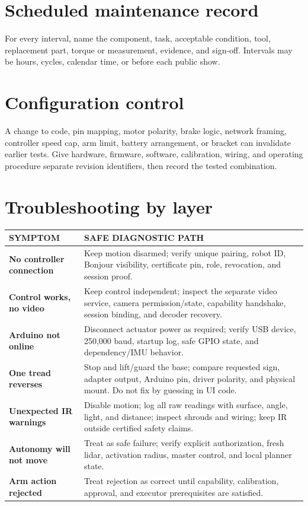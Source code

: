 \documentclass[10pt,openany]{book}
\begin{document}
\section{Scheduled maintenance record}

For every interval, name the component, task, acceptable condition, tool, replacement part, torque or measurement, evidence, and sign-off. Intervals may be hours, cycles, calendar time, or before each public show.

\section{Configuration control}

A change to code, pin mapping, motor polarity, brake logic, network framing, controller speed cap, arm limit, battery arrangement, or bracket can invalidate earlier tests. Give hardware, firmware, software, calibration, wiring, and operating procedure separate revision identifiers, then record the tested combination.

\section{Troubleshooting by layer}

\begin{tabularx}{\textwidth}{>{\robcondensed\bfseries\color{ROBAccent}}p{1.35in} X}
\toprule
SYMPTOM & SAFE DIAGNOSTIC PATH\\
\midrule
No controller connection & Keep motion disarmed; verify unique pairing, robot ID, Bonjour visibility, certificate pin, role, revocation, and session proof.\\
Control works, no video & Keep control independent; inspect the separate video service, camera permission/state, capability handshake, session binding, and decoder recovery.\\
Arduino not online & Disconnect actuator power as required; verify USB device, 250,000 baud, startup log, safe GPIO state, and dependency/IMU behavior.\\
One tread reverses & Stop and lift/guard the base; compare requested sign, adapter output, Arduino pin, driver polarity, and physical mount. Do not fix by guessing in UI code.\\
Unexpected IR warnings & Disable motion; log all raw readings with surface, angle, light, and distance; inspect shrouds and wiring; keep IR outside certified safety claims.\\
Autonomy will not move & Treat as safe failure; verify explicit authorization, fresh lidar, activation radius, master control, and local planner state.\\
Arm action rejected & Treat rejection as correct until capability, calibration, approval, and executor prerequisites are satisfied.\\
\bottomrule
\end{tabularx}
\end{document}
